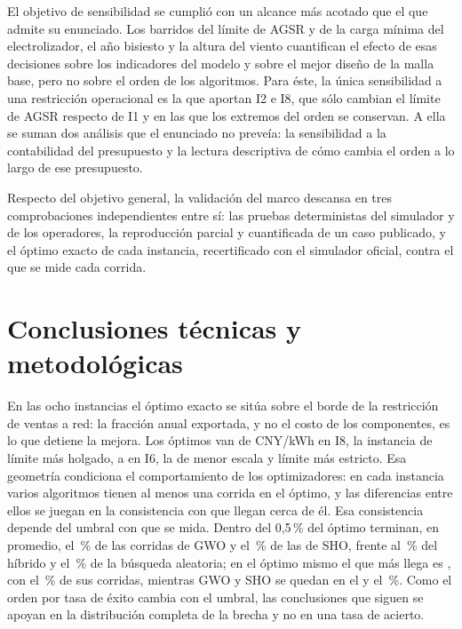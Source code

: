 El objetivo de sensibilidad se cumplió con un alcance más acotado que el que admite su enunciado. Los barridos del límite de AGSR y de la carga mínima del electrolizador, el año bisiesto y la altura del viento cuantifican el efecto de esas decisiones sobre los indicadores del modelo y sobre el mejor diseño de la malla base, pero no sobre el orden de los algoritmos. Para éste, la única sensibilidad a una restricción operacional es la que aportan I2 e I8, que sólo cambian el límite de AGSR respecto de I1 y en las que los extremos del orden se conservan. A ella se suman dos análisis que el enunciado no preveía: la sensibilidad a la contabilidad del presupuesto y la lectura descriptiva de cómo cambia el orden a lo largo de ese presupuesto.

Respecto del objetivo general, la validación del marco descansa en tres comprobaciones independientes entre sí: las pruebas deterministas del simulador y de los operadores, la reproducción parcial y cuantificada de un caso publicado, y el óptimo exacto de cada instancia, recertificado con el simulador oficial, contra el que se mide cada corrida.

\section{Conclusiones técnicas y metodológicas}

En las ocho instancias el óptimo exacto se sitúa sobre el borde de la restricción de ventas a red: la fracción anual exportada, y no el costo de los componentes, es lo que detiene la mejora. Los óptimos van de \BFHLCOE{} CNY/kWh en I8, la instancia de límite más holgado, a \BFFLCOE{} en I6, la de menor escala y límite más estricto. Esa geometría condiciona el comportamiento de los optimizadores: en cada instancia varios algoritmos tienen al menos una corrida en el óptimo, y las diferencias entre ellos se juegan en la consistencia con que llegan cerca de él. Esa consistencia depende del umbral con que se mida. Dentro del 0,5\,\% del óptimo terminan, en promedio, el \SuccessHalfPctGwo\,\% de las corridas de GWO y el \SuccessHalfPctSho\,\% de las de SHO, frente al \SuccessHalfPctPsoGa\,\% del híbrido y el \SuccessHalfPctRandom\,\% de la búsqueda aleatoria; en el óptimo mismo el que más llega es \InOptBestAlgorithm, con el \InOptBestPct\,\% de sus corridas, mientras GWO y SHO se quedan en el \InOptPctGwo{} y el \InOptPctSho\,\%. Como el orden por tasa de éxito cambia con el umbral, las conclusiones que siguen se apoyan en la distribución completa de la brecha y no en una tasa de acierto.

